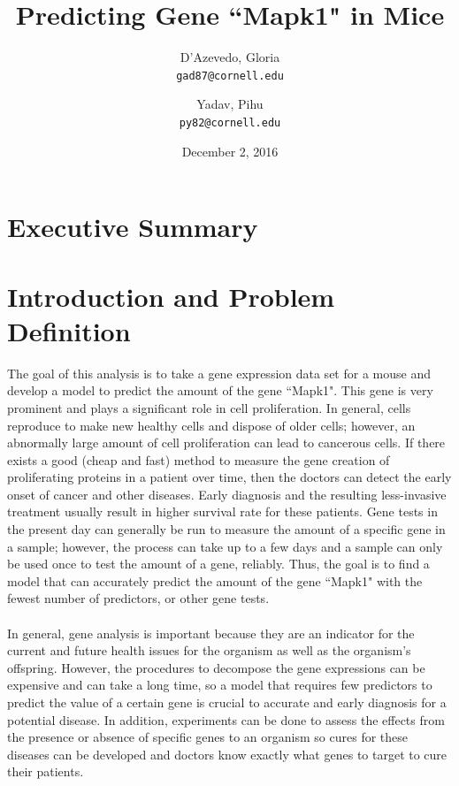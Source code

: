 \documentclass{article}
\title{Predicting Gene ``Mapk1" in Mice}
\author{
  D'Azevedo, Gloria\\
  \texttt{gad87@cornell.edu}
  \and
  Yadav, Pihu\\
  \texttt{py82@cornell.edu}
}
\date{December 2, 2016}
\begin{document}
\maketitle

\tableofcontents

\section{Executive Summary}

\section{Introduction and Problem Definition}
The goal of this analysis is to take a gene expression data set for a mouse and develop a model to predict the amount of the gene ``Mapk1".  This gene is very prominent and plays a significant role in cell proliferation.  In general, cells reproduce to make new healthy cells and dispose of older cells; however, an abnormally large amount of cell proliferation can lead to cancerous cells.  If there exists a good (cheap and fast) method to measure the gene creation of proliferating proteins in a patient over time, then the doctors can detect the early onset of cancer and other diseases.  Early diagnosis and the resulting less-invasive treatment usually result in higher survival rate for these patients.  Gene tests in the present day can generally be run to measure the amount of a specific gene in a sample; however, the process can take up to a few days and a sample can only be used once to test the amount of a gene, reliably.  Thus, the goal is to find a model that can accurately predict the amount of the gene  ``Mapk1" with the fewest number of predictors, or other gene tests.\\
\null\\
%
In general, gene analysis is important because they are an indicator for the current and future health issues for the organism as well as the organism's offspring.  However, the procedures to decompose the gene expressions can be expensive and can take a long time, so a model that requires few predictors to predict the value of a certain gene is crucial to accurate and early diagnosis for a potential disease.  In addition, experiments can be done to assess the effects from the presence or absence of specific genes to an organism so cures for these diseases can be developed and doctors know exactly what genes to target to cure their patients.\\
\end{document}
